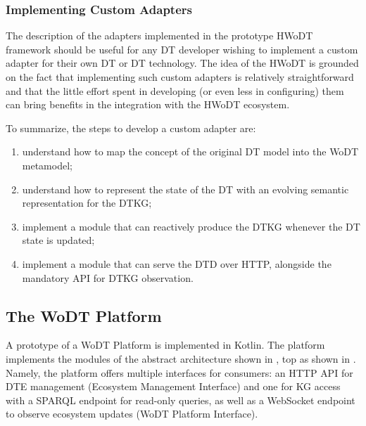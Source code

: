 \subsubsection{Implementing Custom Adapters}
The description of the adapters implemented in the prototype \ac{HWoDT} framework should be useful for any \ac{DT} developer wishing to implement a custom adapter for their own \ac{DT} or \ac{DT} technology. 
%
The idea of the \ac{HWoDT} is grounded on the fact that implementing such custom adapters is relatively straightforward and that the little effort spent in developing (or even less in configuring) them can bring benefits in the integration with the \ac{HWoDT} ecosystem.

To summarize, the steps to develop a custom adapter are: 
\begin{enumerate}
    \item understand how to map the concept of the original \ac{DT} model into the \ac{WoDT} metamodel;
    \item understand how to represent the state of the \ac{DT} with an evolving semantic representation for the \ac{DTKG};
    \item implement a module that can reactively produce the \ac{DTKG} whenever the \ac{DT} state is updated;
    \item implement a module that can serve the \ac{DTD} over HTTP, alongside the mandatory \ac{API} for \ac{DTKG} observation.
\end{enumerate}

\subsection{The WoDT Platform}

A prototype of a \ac{WoDT} Platform is implemented in Kotlin.
The platform implements the modules of the abstract architecture shown in , top as shown in .
%
Namely, the platform offers multiple interfaces for consumers: an HTTP \ac{API} for \ac{DTE} management (Ecosystem Management Interface) and one for \ac{KG} access with a SPARQL endpoint for read-only queries, as well as a WebSocket endpoint to observe ecosystem updates (\ac{WoDT} Platform Interface).

